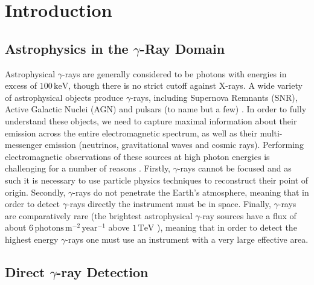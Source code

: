 \chapter{\label{ch:1-intro}Introduction} 
\minitoc
\section{Astrophysics in the \ensuremath{\gamma}-Ray Domain}
Astrophysical $\gamma$-rays are generally considered to be photons with energies in excess of $\mathrm{100\,keV}$, though there is no strict cutoff against X-rays. A wide variety of astrophysical objects produce $\gamma$-rays, including Supernova Remnants (SNR), Active Galactic Nuclei (AGN) and pulsars (to name but a few) \cite{scienceCTA}. In order to fully understand these objects, we need to capture maximal information about their emission across the entire electromagnetic spectrum, as well as their multi-messenger emission (neutrinos, gravitational waves and cosmic rays).  Performing electromagnetic observations of these sources at high photon energies is challenging for a number of reasons \cite{jamieiact}. Firstly,  $\gamma$-rays cannot be focused and as such it is necessary to use particle physics techniques to reconstruct their point of origin. Secondly, $\gamma$-rays do not penetrate the Earth's atmosphere, meaning that in order to detect $\gamma$-rays directly the instrument must be in space. Finally, $\gamma$-rays are comparatively rare (the brightest astrophysical $\gamma$-ray sources have a flux of about $\mathrm{6\,photons\,m^{-2}\,year^{-1}}$ above $\mathrm{1\,TeV}$ \cite{jamieiact}), meaning that in order to detect the highest energy $\gamma$-rays one must use an instrument with a very large effective area.
\section{Direct \ensuremath{\gamma}-ray Detection}
